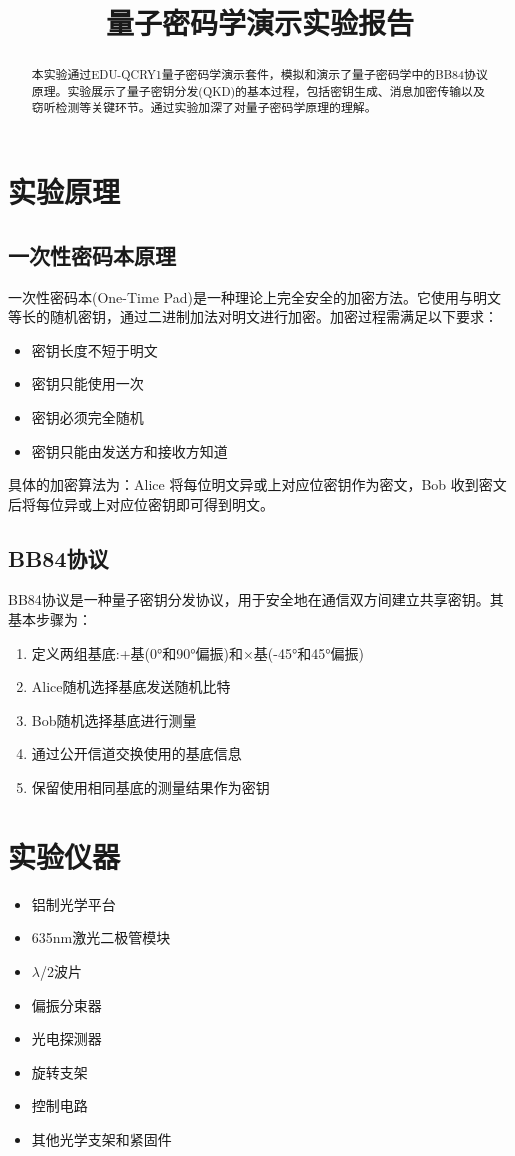\documentclass{ctexart}
\title{量子密码学演示实验报告}
\begin{document}
\maketitle

\begin{abstract}
本实验通过EDU-QCRY1量子密码学演示套件，模拟和演示了量子密码学中的BB84协议原理。实验展示了量子密钥分发(QKD)的基本过程，包括密钥生成、消息加密传输以及窃听检测等关键环节。通过实验加深了对量子密码学原理的理解。
\end{abstract}

\section{实验原理}
\subsection{一次性密码本原理}
一次性密码本(One-Time Pad)是一种理论上完全安全的加密方法。它使用与明文等长的随机密钥，通过二进制加法对明文进行加密。加密过程需满足以下要求：
\begin{itemize}
\item 密钥长度不短于明文
\item 密钥只能使用一次
\item 密钥必须完全随机
\item 密钥只能由发送方和接收方知道
\end{itemize}

具体的加密算法为：Alice 将每位明文异或上对应位密钥作为密文，Bob 收到密文后将每位异或上对应位密钥即可得到明文。
\subsection{BB84协议}
BB84协议是一种量子密钥分发协议，用于安全地在通信双方间建立共享密钥。其基本步骤为：
\begin{enumerate}
\item 定义两组基底:+基(0°和90°偏振)和×基(-45°和45°偏振)
\item Alice随机选择基底发送随机比特
\item Bob随机选择基底进行测量
\item 通过公开信道交换使用的基底信息
\item 保留使用相同基底的测量结果作为密钥
\end{enumerate}

\section{实验仪器}
\begin{itemize}
\item 铝制光学平台
\item 635nm激光二极管模块
\item $\lambda$/2波片
\item 偏振分束器
\item 光电探测器
\item 旋转支架
\item 控制电路
\item 其他光学支架和紧固件
\end{itemize}
\end{document}
